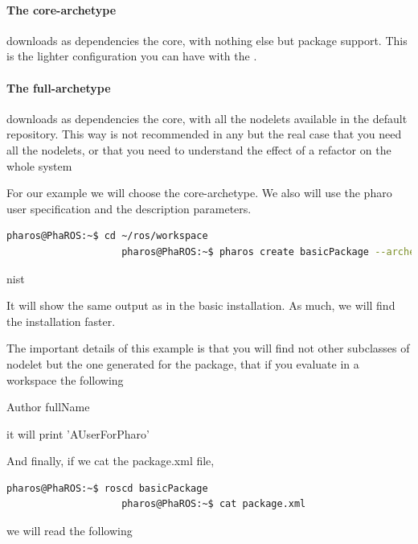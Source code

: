 \documentclass[a4paper,10pt,twoside]{book}
\begin{document}
				\paragraph{The core-archetype} downloads as dependencies the \fwkName{} core, with nothing else but package support. This is the lighter configuration you can have with the \installationTool{}.
				
				\paragraph{The full-archetype} downloads as dependencies the \fwkName{} core, with all the nodelets available in the default repository. This way is not recommended in any but the real case that you need all the nodelets, or that you need to understand the effect of a refactor on the whole system

				For our example we will choose the core-archetype. We also will use the pharo user specification and the description parameters.
				
				
				\begin{lstlisting}[language=bash,title={ Unsilent package creation }]
					pharos@PhaROS:~$ cd ~/ros/workspace
					pharos@PhaROS:~$ pharos create basicPackage --archetype=core-archetype --pharo-user=AUserForPharo --description="This is an example for the PhaROS package creation chapter" --force-new
				\end{lstlisting} 
				nist
				
				
				It will show the same output as in the basic installation. As much, we will find the installation faster. 
				
				The important details of this example is that you will find not other subclasses of nodelet but the one generated for the package, that if you evaluate in a workspace the following
				
				\begin{code}
					Author fullName
				\end{code}
				
				it will print 'AUserForPharo'
				
				
				And finally, if we cat the package.xml file,
				
				
				\begin{lstlisting}[language=bash,title={ roscd - cat }]
					pharos@PhaROS:~$ roscd basicPackage
					pharos@PhaROS:~$ cat package.xml
				\end{lstlisting} 
				
				 we will read the following 
				
\end{document}
